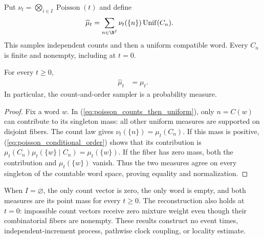 \begin{definition}
\label{def:poisson_counts_then_uniform}
\leanok
{}
Put $\nu_t=\bigotimes_{i\in I}\operatorname{Poisson}(t)$ and define
\begin{align}
 \widehat\mu_t
   &=\sum_{n\in\N^I}\nu_t(\{n\})\operatorname{Unif}(C_n).
 \label{eq:poisson_counts_then_uniform}
\end{align}
This samples independent counts and then a uniform compatible word.
Every $C_n$ is finite and nonempty, including at $t=0$.
\end{definition}

\begin{theorem}
\label{thm:poisson_counts_then_uniform}
\leanok
{}
For every $t\ge0$,
\begin{align}
 \widehat\mu_t&=\mu_t.
 \label{eq:poisson_counts_then_uniform_eq}
\end{align}
In particular, the count-and-order sampler is a probability measure.
\end{theorem}
\begin{proof}
\leanok
{}
Fix a word $w$. In (\ref{eq:poisson_counts_then_uniform}), only
$n=C(w)$ can contribute to its singleton mass: all other uniform measures
are supported on disjoint fibers. The count law gives
$\nu_t(\{n\})=\mu_t(C_n)$.
If this mass is positive, (\ref{eq:poisson_conditional_order}) shows that
its contribution is $\mu_t(C_n)\mu_t(\{w\}\mid C_n)=\mu_t(\{w\})$.
If the fiber has zero mass, both the contribution and $\mu_t(\{w\})$
vanish. Thus the two measures agree on every singleton of the countable
word space, proving equality and normalization.
\end{proof}

When $I=\varnothing$, the only count vector is zero, the only word is
empty, and both measures are its point mass for every $t\ge0$.
The reconstruction also holds at $t=0$: impossible count vectors receive
zero mixture weight even though their combinatorial fibers are nonempty.
These results construct no event times, independent-increment process,
pathwise clock coupling, or locality estimate.
